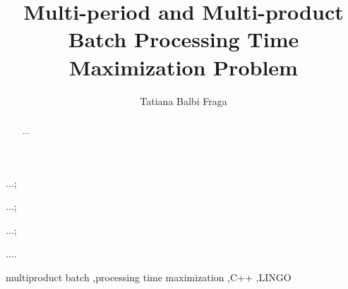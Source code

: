 \documentclass[authoryear,preprint,12pt]{elsarticle}
\begin{document}
\begin{frontmatter}


\title{Multi-period and Multi-product Batch Processing Time Maximization Problem}



\author{Tatiana Balbi Fraga}


\begin{abstract}
...
\end{abstract}
\begin{graphicalabstract}
\end{graphicalabstract}

\begin{highlights}
\item ...;
\item ...;
\item ...;
\item ....
\end{highlights}

\begin{keyword}
multiproduct batch \sep processing time maximization \sep C++ \sep LINGO
\end{keyword}
\end{frontmatter}
\end{document}

